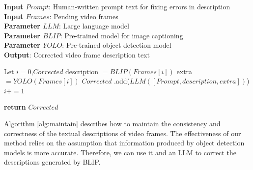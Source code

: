 \begin{algorithm}[htb]
\caption{Algorithm for maintaining consistency in frame descriptions}
\label{alg:maintain}
\textbf{Input $Prompt$}: Human-written prompt text for fixing errors in description\\
\textbf{Input $Frames$}: Pending video frames\\
\textbf{Parameter $LLM$}: Large language model\\
\textbf{Parameter $BLIP$}: Pre-trained model for image captioning\\
\textbf{Parameter $YOLO$}: Pre-trained object detection model \\
\textbf{Output}: Corrected video frame description text \\
\begin{algorithmic}[1] %
\STATE Let $i=0$,$Corrected$
\STATE description $= BLIP(Frames[i])$
\STATE extra $= YOLO(Frames[i])$
\STATE $Corrected$
\STATE \quad.add($LLM([Prompt, description, extra])$)
\STATE $i += 1$
\ENDWHILE

\STATE \textbf{return} $Corrected$
\end{algorithmic}
\end{algorithm}

Algorithm \ref{alg:maintain} describes how to maintain the consistency and correctness of the textual descriptions of video frames. The effectiveness of our method relies on the assumption that information produced by object detection models is more accurate. Therefore, we can use it and an LLM to correct the descriptions generated by BLIP.

